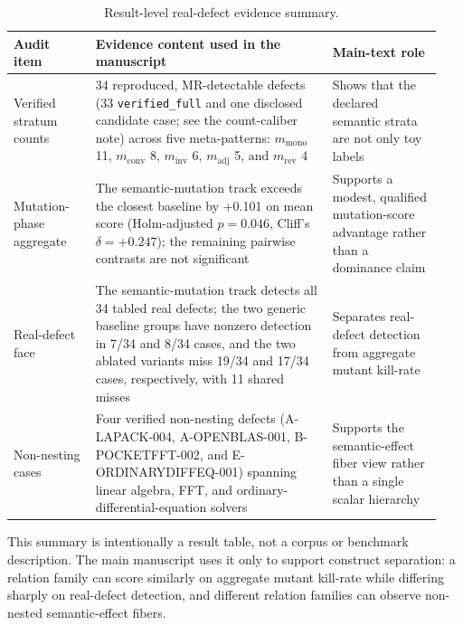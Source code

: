 \documentclass[manuscript,screen,review]{acmart}
\begin{document}
{%
\small
\begin{longtable}[]{@{}p{0.18\linewidth}p{0.52\linewidth}p{0.24\linewidth}@{}}
\caption{Result-level real-defect evidence summary.}\label{tab:realdefect-ledger}\\
\toprule\noalign{}
Audit item & Evidence content used in the manuscript & Main-text role \\
\midrule\noalign{}
\endfirsthead
\endhead
\bottomrule\noalign{}
\endlastfoot
Verified stratum counts & 34 reproduced, MR-detectable defects (33
\texttt{verified\_full} and one disclosed candidate case; see the
count-caliber note) across five
meta-patterns: \(m_{\mathrm{mono}}\) 11, \(m_{\mathrm{conv}}\) 8,
\(m_{\mathrm{inv}}\) 6, \(m_{\mathrm{adj}}\) 5, and
\(m_{\mathrm{rev}}\) 4 & Shows that the declared semantic strata are not
only toy labels \\
Mutation-phase aggregate & The semantic-mutation track exceeds the
closest baseline by +0.101 on mean score (Holm-adjusted \(p = 0.046\),
Cliff's \(\delta = +0.247\)); the remaining pairwise contrasts are not
significant & Supports a modest, qualified
mutation-score advantage rather than a dominance claim \\
Real-defect face & The semantic-mutation track detects all 34 tabled
real defects; the two generic baseline groups have nonzero detection in
7/34 and 8/34 cases, and the two ablated variants miss 19/34 and 17/34
cases, respectively, with 11 shared misses & Separates real-defect detection from aggregate mutant
kill-rate \\
Non-nesting cases & Four verified non-nesting defects (A-LAPACK-004,
A-OPENBLAS-001, B-POCKETFFT-002, and E-ORDINARYDIFFEQ-001) spanning
linear
algebra, FFT, and ordinary-differential-equation solvers & Supports the semantic-effect fiber view rather
than a single scalar hierarchy \\
\end{longtable}
\normalsize
}

This summary is intentionally a result table, not a corpus or benchmark
description. The main manuscript uses it only to support construct
separation: a relation family can score similarly on aggregate mutant
kill-rate while differing sharply on real-defect detection, and different
relation families can observe non-nested semantic-effect fibers.
\end{document}
